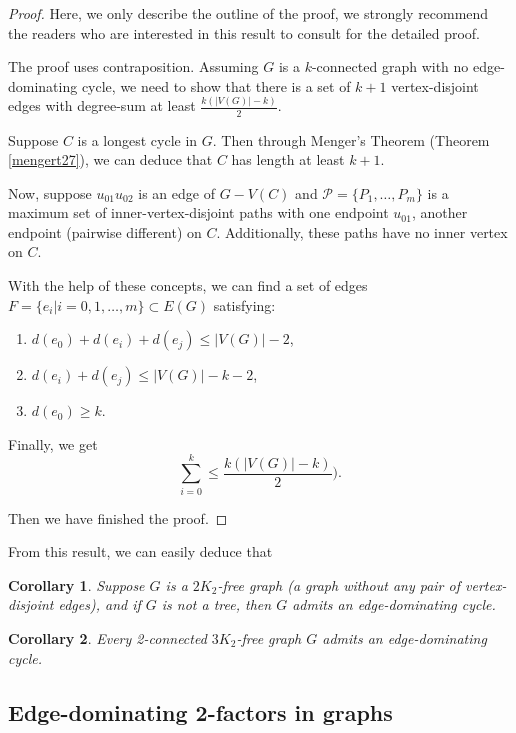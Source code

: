 \documentclass[12pt]{report}
\newtheorem{corollary}{Corollary}
\begin{document}
\begin{proof}
Here, we only describe the outline of the proof, we strongly recommend the readers who are interested in this result to consult \cite{veldman1983existence} for the detailed proof.

The proof uses contraposition. Assuming $G$ is a $k$-connected graph with no edge-dominating cycle, we need to show that there is a set of $k+1$ vertex-disjoint edges with degree-sum at least $\frac{k(|V(G)|-k)}{2}$.

Suppose $C$ is a longest cycle in $G$. Then through Menger's Theorem (Theorem \ref{mengert27}), we can deduce that $C$ has length at least $k+1$.

Now, suppose $u_{01}u_{02}$ is an edge of $G-V(C)$ and $\mathcal{P}=\{P_1,\ldots,P_m\}$ is a maximum set of inner-vertex-disjoint  paths with one endpoint $u_{01}$, another endpoint (pairwise different) on $C$. Additionally, these paths have no inner vertex on $C$.


With the help of these concepts, we can find a set of edges $F=\{e_i|i=0,1,\ldots,m\}\subset E(G)$ satisfying:
\begin{enumerate}
\item $d(e_0)+d(e_i)+d(e_j)\le|V(G)|-2$,
\item $d(e_i)+d(e_j)\le|V(G)|-k-2$,
\item $d(e_0)\ge k$.
\end{enumerate}

Finally, we get $$\sum^k_{i=0}\le\frac{k(|V(G)|-k)}{2}).$$

Then we have finished the proof.

\end{proof}

From this result, we can easily deduce that

\begin{corollary}\label{cor2k2edgd}
Suppose $G$ is a $2K_2$-free graph (a graph without any pair of vertex-disjoint edges), and if $G$ is not a tree, then $G$ admits an edge-dominating cycle.
\end{corollary}

\begin{corollary}\label{co32c3kfed}
Every 2-connected $3K_2$-free graph $G$ admits an edge-dominating cycle.
\end{corollary}



\subsection{Edge-dominating 2-factors in graphs}
\end{document}
